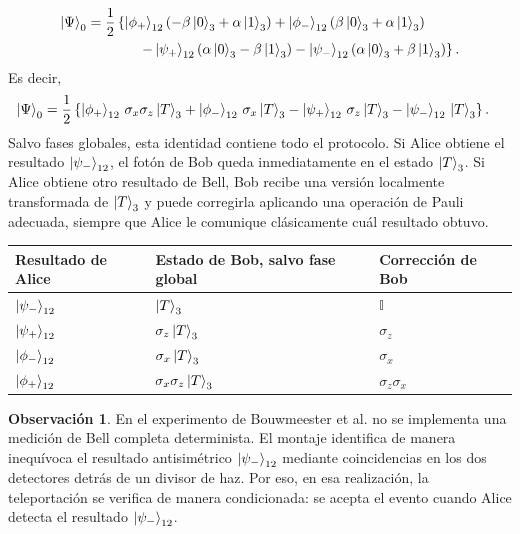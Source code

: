 \documentclass[12pt,a4paper]{article}
\theoremstyle{definition}
\newtheorem{observacion}[definicion]{Observación}
\theoremstyle{plain}
\theoremstyle{remark}
\newcommand{\I}{\mathbb{I}}
\begin{document}
\begin{align*}
    \ket{\Psi}_0
    &=
    \frac{1}{2}
    \left\{
        \ket{\phi_+}_{12}
        \left(-\beta\ket{0}_3+\alpha\ket{1}_3\right)
        +
        \ket{\phi_-}_{12}
        \left(\beta\ket{0}_3+\alpha\ket{1}_3\right)
    \right.\\
    &\hspace{1.3cm}
    \left.
        -
        \ket{\psi_+}_{12}
        \left(\alpha\ket{0}_3-\beta\ket{1}_3\right)
        -
        \ket{\psi_-}_{12}
        \left(\alpha\ket{0}_3+\beta\ket{1}_3\right)
    \right\}.
\end{align*}
Es decir,
\begin{align*}
    \ket{\Psi}_0
    &=
    \frac{1}{2}
    \left\{
        \ket{\phi_+}_{12}\,\sigma_x\sigma_z\ket{T}_3
        +
        \ket{\phi_-}_{12}\,\sigma_x\ket{T}_3
        -
        \ket{\psi_+}_{12}\,\sigma_z\ket{T}_3
        -
        \ket{\psi_-}_{12}\,\ket{T}_3
    \right\}.
\end{align*}
Salvo fases globales, esta identidad contiene todo el protocolo. Si Alice obtiene el resultado $\ket{\psi_-}_{12}$, el fotón de Bob queda inmediatamente en el estado $\ket{T}_3$. Si Alice obtiene otro resultado de Bell, Bob recibe una versión localmente transformada de $\ket{T}_3$ y puede corregirla aplicando una operación de Pauli adecuada, siempre que Alice le comunique clásicamente cuál resultado obtuvo.

\begin{center}
\renewcommand{\arraystretch}{1.25}
\begin{tabular}{>{\centering\arraybackslash}p{} >{\centering\arraybackslash}p{} >{\centering\arraybackslash}p{}}
\toprule
\textbf{Resultado de Alice} & \textbf{Estado de Bob, salvo fase global} & \textbf{Corrección de Bob} \\
\midrule
$\ket{\psi_-}_{12}$ & $\ket{T}_3$ & $\I$ \\
$\ket{\psi_+}_{12}$ & $\sigma_z\ket{T}_3$ & $\sigma_z$ \\
$\ket{\phi_-}_{12}$ & $\sigma_x\ket{T}_3$ & $\sigma_x$ \\
$\ket{\phi_+}_{12}$ & $\sigma_x\sigma_z\ket{T}_3$ & $\sigma_z\sigma_x$ \\
\bottomrule
\end{tabular}
\end{center}

\begin{observacion}
En el experimento de Bouwmeester et al. no se implementa una medición de Bell completa determinista. El montaje identifica de manera inequívoca el resultado antisimétrico $\ket{\psi_-}_{12}$ mediante coincidencias en los dos detectores detrás de un divisor de haz. Por eso, en esa realización, la teleportación se verifica de manera condicionada: se acepta el evento cuando Alice detecta el resultado $\ket{\psi_-}_{12}$.
\end{observacion}
\end{document}
